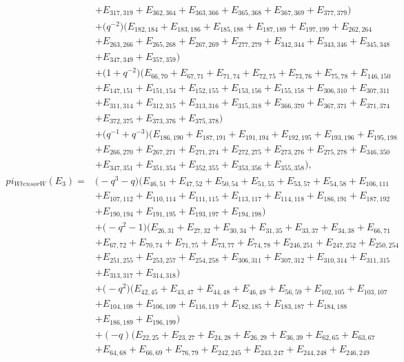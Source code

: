 \documentclass[10pt,a4paper]{amsart}
\numberwithin{equation}{section}
\theoremstyle{definition}
\def\pi{pi}
\def\otimes{ tensor }
\begin{document}
\begin{align*}
&+E_{317,319}+E_{362,364}+E_{363,366}+E_{365,368}+E_{367,369}+E_{377,379})
\\
&+\bigl(q^{-2}\bigr)(E_{182,184}+E_{183,186}+E_{185,188}+E_{187,189}+E_{197,199}+E_{262,264}\\
&+E_{263,266}+E_{265,268}+E_{267,269}+E_{277,279}+E_{342,344}+E_{343,346}+E_{345,348}\\
&+E_{347,349}+E_{357,359})
\\
&+\bigl(1 + q^{-2}\bigr)(E_{66,70}+E_{67,71}+E_{71,74}+E_{72,75}+E_{73,76}+E_{75,78}+E_{146,150}\\
&+E_{147,151}+E_{151,154}+E_{152,155}+E_{153,156}+E_{155,158}+E_{306,310}+E_{307,311}\\
&+E_{311,314}+E_{312,315}+E_{313,316}+E_{315,318}+E_{366,370}+E_{367,371}+E_{371,374}\\
&+E_{372,375}+E_{373,376}+E_{375,378})
\\
&+\bigl(q^{-1} + q^{-3}\bigr)(E_{186,190}+E_{187,191}+E_{191,194}+E_{192,195}+E_{193,196}+E_{195,198}\\
&+E_{266,270}+E_{267,271}+E_{271,274}+E_{272,275}+E_{273,276}+E_{275,278}+E_{346,350}\\
&+E_{347,351}+E_{351,354}+E_{352,355}
+E_{353,356}+E_{355,358}),\\
 \pi_{W \otimes W}(E_3) ={}&
\bigl(-q^3 - q\bigr)(E_{46,51}+E_{47,52}+E_{50,54}+E_{51,55}+E_{53,57}+E_{54,58}+E_{106,111}\\
&
+E_{107,112}+E_{110,114}+E_{111,115}+E_{113,117}+E_{114,118}+E_{186,191}+E_{187,192}\\
&+E_{190,194}+E_{191,195}+E_{193,197}+E_{194,198})\\
&+\bigl(-q^2 - 1\bigr)(E_{26,31}+E_{27,32}+E_{30,34}+E_{31,35}+E_{33,37}+E_{34,38}+E_{66,71}\\
&+E_{67,72}+E_{70,74}+E_{71,75}+E_{73,77}+E_{74,78}+E_{246,251}+E_{247,252}+E_{250,254}\\
&+E_{251,255}+E_{253,257}+E_{254,258}+E_{306,311}+E_{307,312}+E_{310,314}+E_{311,315}\\
&+E_{313,317}+E_{314,318})\\
&+\bigl(-q^2\bigr)(E_{42,45}+E_{43,47}+E_{44,48}+E_{46,49}+E_{56,59}+E_{102,105}+E_{103,107}\\
&+E_{104,108}+E_{106,109}+E_{116,119}+E_{182,185}+E_{183,187}+E_{184,188}\\
&+E_{186,189}+E_{196,199})
\\
&+(-q)(E_{22,25}+E_{23,27}+E_{24,28}+E_{26,29}+E_{36,39}+E_{62,65}+E_{63,67}\\
&+E_{64,68}+E_{66,69}+E_{76,79}+E_{242,245}+E_{243,247}+E_{244,248}+E_{246,249}\\

\end{align*}
\end{document}
